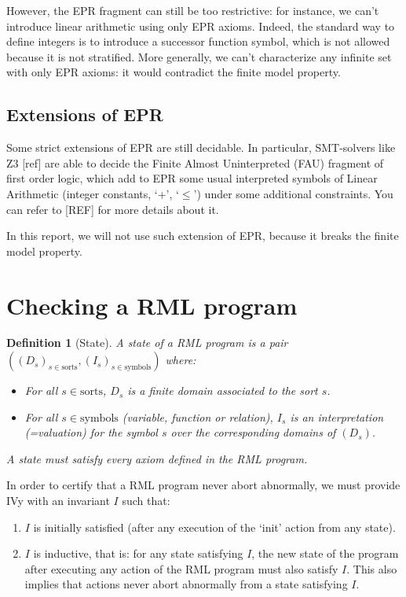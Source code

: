 \documentclass[11pt,a4paper,oldfontcommands]{memoir}
\newtheorem*{definition}{Definition}
\begin{document}
        However, the EPR fragment can still be too restrictive: for instance, we can't introduce linear arithmetic using only EPR axioms.
        Indeed, the standard way to define integers is to introduce a successor function symbol, which is not allowed because it is not stratified.
        More generally, we can't characterize any infinite set with only EPR axioms: it would contradict the finite model property.

        \subsection{Extensions of EPR}

        Some strict extensions of EPR are still decidable.
        In particular, SMT-solvers like Z3 [ref] are able to decide the Finite Almost Uninterpreted (FAU) fragment of first order logic,
        which add to EPR some usual interpreted symbols of Linear Arithmetic (integer constants, `+', `\( \leq \)') under some additional constraints.
        You can refer to [REF] for more details about it. 
        
        In this report, we will not use such extension of EPR, because it breaks the finite model property.
    
    \section{Checking a RML program}

    \begin{definition}[State]
        A state of a RML program is a pair \(((D_s)_{s\in \text{sorts}}, (I_s)_{s\in \text{symbols}})\) where:
        \begin{itemize}
            \item For all \(s \in \text{sorts}\), \(D_s\) is a finite domain associated to the sort \(s\).
            \item For all \(s \in \text{symbols}\) (variable, function or relation), \(I_s\) is an interpretation (=valuation) for the symbol \(s\) over the corresponding domains of \((D_s)\).
        \end{itemize}
        A state must satisfy every axiom defined in the RML program.
    \end{definition}

    In order to certify that a RML program never abort abnormally, we must provide IVy with an invariant \(I\) such that:
    \begin{enumerate}
        \item \(I\) is initially satisfied (after any execution of the `init' action from any state).
        \item \(I\) is inductive, that is: for any state satisfying \(I\), the new state of the program after executing any action of the RML program must also satisfy \(I\).
        This also implies that actions never abort abnormally from a state satisfying \(I\).
    \end{enumerate}
\end{document}
